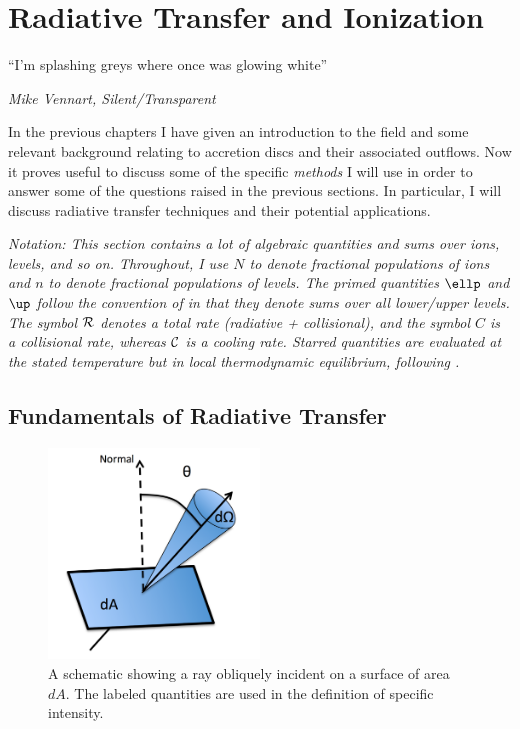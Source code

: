 \chapter{Radiative Transfer and Ionization}

\epigraph{``I'm splashing greys where once was glowing white''}{{\sl Mike Vennart, Silent/Transparent}}

In the previous chapters I have given an introduction to the field and 
some relevant background relating to accretion 
discs and their associated outflows. Now it proves useful
to discuss some of the specific {\em methods} I will use
in order to answer some of the questions raised in the previous sections.
In particular, I will discuss radiative transfer techniques and 
their potential applications.

{\sl Notation: This section contains a lot of algebraic quantities and sums over
ions, levels, and so on. Throughout, I use $N$ to denote fractional
populations of ions and $n$ to denote fractional populations of levels. 
The primed quantities $\ellp$ and $\up$ follow the convention of 
\cite{lucy2002} in that they denote sums over all lower/upper levels.
The symbol ${\cal R}$ denotes a total rate (radiative + collisional), 
and the symbol $C$ is a collisional rate, whereas ${\cal C}$ is a cooling 
rate. Starred quantities are evaluated at the stated temperature but 
in local thermodynamic equilibrium, following \cite{mihalas}. 
}



\section{Fundamentals of Radiative Transfer}

\begin{figure}
\centering
\includegraphics[width=0.5\textwidth]{figures/03-radtrans/rays_schematic.png}
\caption
{
A schematic showing a ray obliquely incident on a surface of area $dA$.
The labeled quantities are used in the definition of specific intensity.
} 
\label{fig:ray}
\end{figure}


